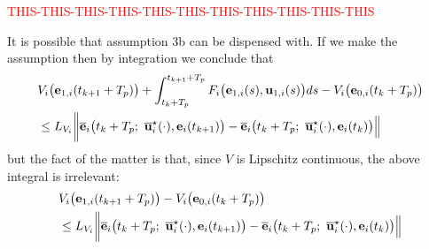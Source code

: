 \textcolor{red}{THIS-THIS-THIS-THIS-THIS-THIS-THIS-THIS-THIS-THIS-THIS}
\begin{bw_box}
  It is possible that assumption 3b can be dispensed with.
  If we make the assumption then by integration we conclude that
  \begin{align}
    &V_i\big(\vect{e}_{1,i}(t_{k+1} + T_p)\big)
    + \int_{t_k + T_p}^{t_{k+1} + T_p} F_i\big(\vect{e}_{1,i}(s), \vect{u}_{1,i}(s)\big) ds
    - V_i\big(\vect{e}_{0,i}(t_k + T_p)\big) \\
    &\leq L_{V_i}\bigg \|\overline{\vect{e}}_i\big(t_k + T_p;\ \overline{\vect{u}}_i^{\star}(\cdot), \vect{e}_i(t_{k+1})\big)
    - \overline{\vect{e}}_i\big(t_k + T_p;\ \overline{\vect{u}}_i^{\star}(\cdot), \vect{e}_i(t_k) \big)\Big\|
  \end{align}
  but the fact of the matter is that, since $V$ is Lipschitz continuous,
  the above integral is irrelevant:
  \begin{align}
    &V_i\big(\vect{e}_{1,i}(t_{k+1} + T_p)\big) - V_i\big(\vect{e}_{0,i}(t_k + T_p)\big) \\
    &\leq L_{V_i}\bigg \|\overline{\vect{e}}_i\big(t_k + T_p;\ \overline{\vect{u}}_i^{\star}(\cdot), \vect{e}_i(t_{k+1})\big)
    - \overline{\vect{e}}_i\big(t_k + T_p;\ \overline{\vect{u}}_i^{\star}(\cdot), \vect{e}_i(t_k) \big)\Big\|
  \end{align}


\end{bw_box}
